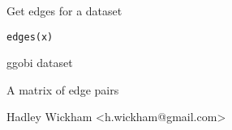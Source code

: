 \begin{Description}\relax
Get edges for a dataset
\end{Description}
\begin{Usage}
\begin{verbatim}edges(x)\end{verbatim}
\end{Usage}
\begin{Arguments}
\begin{ldescription}
\item[\code{x}] ggobi dataset
\end{ldescription}
\end{Arguments}
\begin{Details}\relax
\end{Details}
\begin{Value}
A matrix of edge pairs
\end{Value}
\begin{Author}\relax
Hadley Wickham <h.wickham@gmail.com>
\end{Author}
\begin{Examples}
\begin{ExampleCode}\end{ExampleCode}
\end{Examples}

